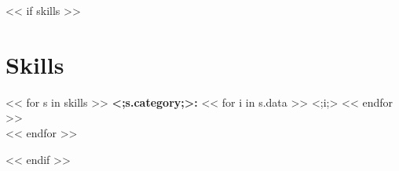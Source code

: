 \documentclass[letterpaper,11pt]{article}
\begin{document}
%

<< if skills >>
\section{Skills}
 \begin{itemize}[leftmargin=0.15in, label={}]
    \small{\item{
    << for s in skills >>
     \textbf{<;s.category;>:}{
         << for i in s.data >>
         <;i;>
         << endfor >>
     } \\
    << endfor >>
    }}
 \end{itemize}
<< endif >>


\end{document}

